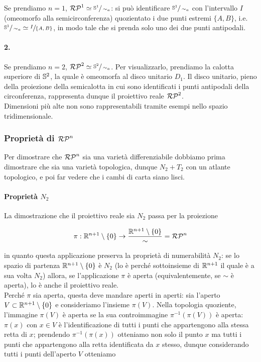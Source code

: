 Se prendiamo $ n=1 $, $ \rp{1} \simeq \sfrac{\S^{1}}{\sim_{a}} $: si può identificare $ \sfrac{\S^{1}}{\sim_{a}} $ con l'intervallo $ I $ (omeomorfo alla semicirconferenza) quozientato i due punti estremi $ \{A,B\} $, i.e. $ \sfrac{\S^{1}}{\sim_{a}} \simeq \sfrac{I}{\{A,B\}} $, in modo tale che si prenda solo uno dei due punti antipodali.

\paragraph{2.}

Se prendiamo $ n=2 $, $ \rp{2} \simeq \sfrac{\S^{2}}{\sim_{a}} $. Per visualizzarlo, prendiamo la calotta superiore di $ \S^{2} $, la quale è omeomorfa al disco unitario $ D_{1} $. Il disco unitario, pieno della proiezione della semicalotta in cui sono identificati i punti antipodali della circonferenza, rappresenta dunque il proiettivo reale $ \rp{2} $.\\
Dimensioni più alte non sono rappresentabili tramite esempi nello spazio tridimensionale.

\subsubsection{Proprietà di $ \rp{n} $}

Per dimostrare che $ \rp{n} $ sia una varietà differenziabile dobbiamo prima dimostrare che sia una varietà topologica, dunque $ N_{2}+T_{2} $ con un atlante topologico, e poi far vedere che i cambi di carta siano lisci.

\paragraph{Proprietà $ N_{2} $}

La dimostrazione che il proiettivo reale sia $ N_{2} $ passa per la proiezione

\begin{equation}
	\pi : \R^{n+1} \setminus \{0\} \to \dfrac{\R^{n+1} \setminus \{0\}}{\sim} = \rp{n}
\end{equation}

in quanto questa applicazione preserva la proprietà di numerabilità $ N_{2} $: se lo spazio di partenza $ \R^{n+1} \setminus \{0\} $ è $ N_{2} $ (lo è perché sottoinsieme di $ \R^{n+1} $ il quale è a sua volta $ N_{2} $) allora, se l'applicazione $ \pi $ è aperta (equivalentemente, se $ \sim $ è aperta), lo è anche il proiettivo reale.\\
Perché $ \pi $ sia aperta, questa deve mandare aperti in aperti: sia l'aperto $ V \subset \R^{n+1} \setminus \{0\} $ e consideriamo l'insieme $ \pi(V) $. Nella topologia quoziente, l'immagine $ \pi(V) $ è aperta se la sua controimmagine $ \pi^{-1}(\pi(V)) $ è aperta: $ \pi(x) $ con $ x \in V $ è l'identificazione di tutti i punti che appartengono alla stessa retta di $ x $; prendendo $ \pi^{-1}(\pi(x)) $ otteniamo non solo il punto $ x $ ma tutti i punti che appartengono alla retta identificata da $ x $ stesso, dunque considerando tutti i punti dell'aperto $ V $ otteniamo

